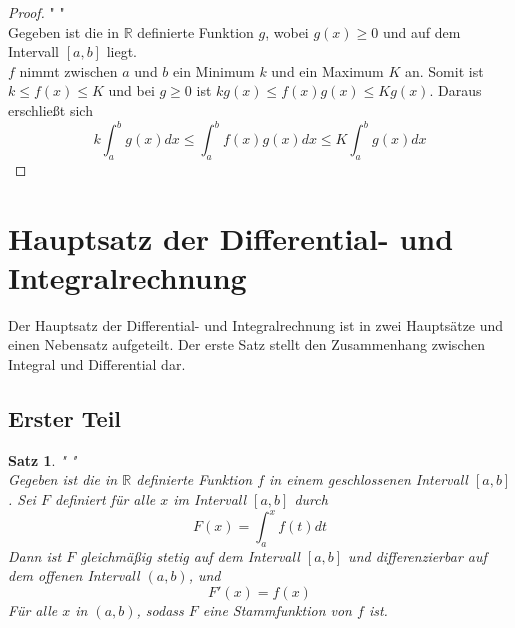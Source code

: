 \documentclass[fontsize=12pt,paper=a4,DIV12,cleardoublepage=empty, 
liststotoc,idxtotoc,bibtotoc]{article}
\newcommand{\RR}{\mathbb{R}}
\theoremstyle{plain}
\newtheorem{satz}{Satz}[subsection]
\theoremstyle{definition}
\begin{document}
	\begin{proof}" "\\
		Gegeben ist die in $\RR$ definierte Funktion $g$, wobei $g(x)\geq0$ und auf dem Intervall $[a, b]$ liegt.\\
		$f$ nimmt zwischen $a$ und $b$ ein Minimum $k$ und ein Maximum $K$ an. Somit ist $k \leq f(x) \leq K$ und bei $g\geq0$ ist $kg(x)\leq f(x)g(x)\leq Kg(x)$. Daraus erschließt sich
		\begin{equation*}
			k \int_{a}^{b}g(x)dx \leq \int_{a}^{b}f(x)g(x)dx\leq K\int_{a}^{b}g(x)dx
		\end{equation*}
	\end{proof}
	
	
	\section{Hauptsatz der Differential- und Integralrechnung}
	
	Der Hauptsatz der Differential- und Integralrechnung ist in zwei Hauptsätze und einen Nebensatz aufgeteilt. Der erste Satz stellt den Zusammenhang zwischen Integral und Differential dar.

	\subsection{Erster Teil}
	\begin{satz}" "\\
		Gegeben ist die in $\RR$ definierte Funktion $f$ in einem geschlossenen Intervall $[a, b]$. Sei $F$ definiert für alle $x$ im Intervall $[a, b]$ durch \\
			\begin{equation*}
				F(x)=\int_{a}^{x}f(t) dt
			\end{equation*}
		Dann ist $F$ gleichmäßig stetig auf dem Intervall $[a, b]$ und differenzierbar auf dem offenen Intervall $(a, b)$, und 
			\begin{equation*}
				F'(x)=f(x)
			\end{equation*}
		Für alle $x$ in $(a, b)$, sodass $F$ eine Stammfunktion von $f$ ist.\\\\
	
	\end{satz}
	
\end{document}
